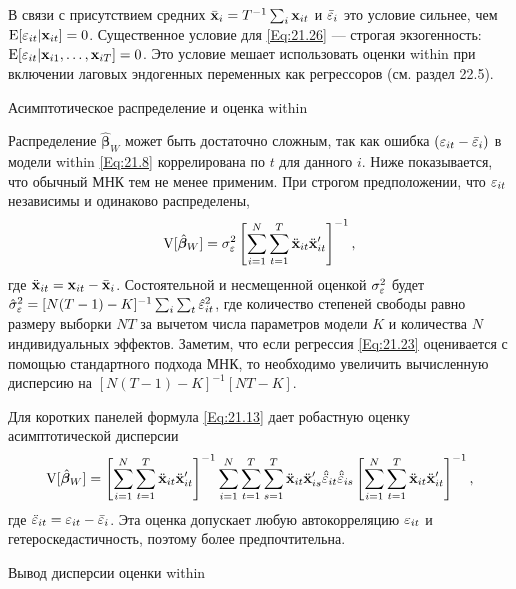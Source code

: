 В связи с присутствием средних $\bar{\mathbf{x}}_i=T^{-1}\sum_i\mathbf{x}_{it}$ и $\bar{\varepsilon}_i$ это условие сильнее, чем $\mathrm E[\varepsilon_{it}|\mathbf{x}_{it}]=0$. Существенное условие для \ref{Eq:21.26} --- строгая экзогенность: $\mathrm E[\varepsilon_{it}|\mathbf{x}_{i1}, \dots, \mathbf{x}_{iT}]=0$. Это условие мешает использовать оценки within при включении лаговых эндогенных переменных как регрессоров (см. раздел 22.5).

{\centering
Асимптотическое распределение и оценка within\\}

Распределение $\hat{\bm\beta}_W$ может быть достаточно сложным, так как ошибка $(\varepsilon_{it}-\bar{\varepsilon}_i)$ в модели within \ref{Eq:21.8} коррелирована по $t$ для данного $i$. Ниже показывается, что обычный МНК тем не менее применим. При строгом предположении, что $\varepsilon_{it}$ независимы и одинаково распределены,
\begin{align}
\mathrm V[\hat{\bm\beta}_W]=\sigma^2_{\varepsilon} \left[ \sum^N_{i=1} \sum^T_{t=1} \ddot{\mathbf{x}}_{it}\ddot{\mathbf{x}}'_{it} \right]^{-1},
\label{Eq:21.27}
\end{align}
где $\ddot{\mathbf{x}}_{it}=\mathbf{x}_{it}-\bar{\mathbf{x}}_i$. Состоятельной и несмещенной оценкой $\sigma^2_{\varepsilon}$ будет $\hat{\sigma}^2_{\varepsilon}=[N(T-1)-K]^{-1}\sum_i\sum_t \hat{\varepsilon}^2_{it}$, где количество степеней свободы равно размеру выборки $NT$ за вычетом числа параметров модели $K$ и количества $N$ индивидуальных эффектов. Заметим, что если регрессия \ref{Eq:21.23} оценивается с помощью стандартного подхода МНК, то необходимо увеличить вычисленную дисперсию на $[N(T-1)-K]^{-1}[NT-K]$.

Для коротких панелей формула \ref{Eq:21.13} дает робастную оценку асимптотической дисперсии
\begin{align}
\mathrm V[\hat{\bm\beta}_W]= \left[ \sum^N_{i=1} \sum^T_{t=1} \ddot{\mathbf{x}}_{it}\ddot{\mathbf{x}}'_{it} \right]^{-1}
\sum^N_{i=1} \sum^T_{t=1} \sum^T_{s=1} \ddot{\mathbf{x}}_{it}\ddot{\mathbf{x}}'_{is} \hat{\ddot{\varepsilon}}_{it} \hat{\ddot{\varepsilon}}_{is}
\left[ \sum^N_{i=1} \sum^T_{t=1} \ddot{\mathbf{x}}_{it}\ddot{\mathbf{x}}'_{it} \right]^{-1},
\label{Eq:21.28}
\end{align}
где $\ddot{\varepsilon}_{it}=\varepsilon_{it}-\bar{\varepsilon}_i$. Эта оценка допускает любую автокорреляцию $\varepsilon_{it}$ и гетероскедастичность, поэтому более предпочтительна. 


{\centering
Вывод дисперсии оценки within\\}

